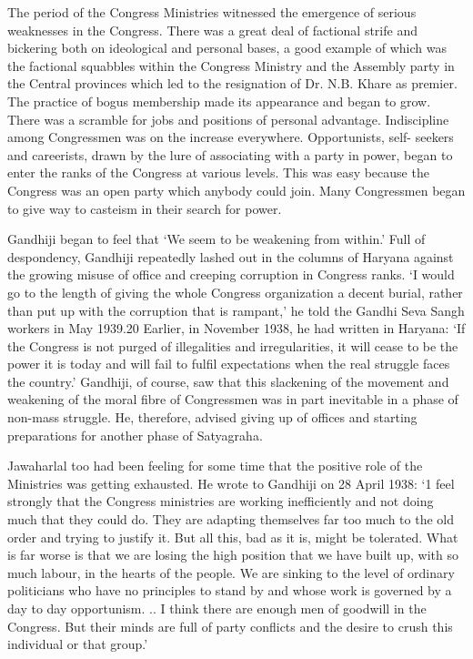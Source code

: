 The period of the Congress Ministries witnessed the emergence of serious weaknesses in the Congress. There was a great deal of factional strife and bickering both on ideological and personal bases, a good example of which was the factional squabbles within the Congress Ministry and the Assembly party in the Central provinces which led to the resignation of Dr. N.B. Khare as premier. The practice of bogus membership made its appearance and began to grow. There was a scramble for jobs and positions of personal advantage. Indiscipline among Congressmen was on the increase everywhere. Opportunists, self- seekers and careerists, drawn by the lure of associating with a party in power, began to enter the ranks of the Congress at various levels. This was easy because the Congress was an open party which anybody could join. Many Congressmen began to give way to casteism in their search for power. 

Gandhiji began to feel that `We seem to be weakening from within.' Full of despondency, Gandhiji repeatedly lashed out in the columns of Haryana against the growing misuse of office and creeping corruption in Congress ranks. `I would go to the length of giving the whole Congress organization a decent burial, rather than put up with the corruption that is rampant,' he told the Gandhi Seva Sangh workers in May 1939.20 Earlier, in November 1938, he had written in Haryana: `If the Congress is not purged of illegalities and irregularities, it will cease to be the power it is today and will fail to fulfil expectations when the real struggle faces the country.' Gandhiji, of course, saw that this slackening of the movement and weakening of the moral fibre of Congressmen was in part inevitable in a phase of non-mass struggle. He, therefore, advised giving up of offices and starting preparations for another phase of Satyagraha. 

Jawaharlal too had been feeling for some time that the positive role of the Ministries was getting exhausted. He wrote to Gandhiji on 28 April 1938: `1 feel strongly that the Congress ministries are working inefficiently and not doing much that they could do. They are adapting themselves far too much to the old order and trying to justify it. But all this, bad as it is, might be tolerated. What is far worse is that we are losing the high position that we have built up, with so much labour, in the hearts of the people. We are sinking to the level of ordinary politicians who have no principles to stand by and whose work is governed by a day to day opportunism. .. I think there are enough men of goodwill in the Congress. But their minds are full of party conflicts and the desire to crush this individual or that group.' 

